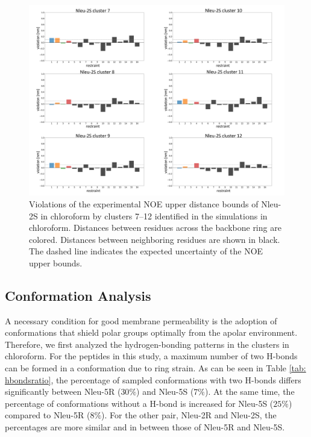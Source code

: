 \begin{figure}[h!]
    \centering
    \includegraphics[width=\textwidth]{7_chapter_5/fig/results/NMR_2Sb.png}
    \caption{Violations  of  the  experimental  NOE  upper  distance  bounds  of  Nleu-2S  in chloroform by clusters 7–12 identified in the simulations in chloroform. Distances between residues across the backbone ring are colored. Distances between neighboring residues are shown in black. The dashed line indicates the expected uncertainty of the NOE upper bounds.}
    \label{fig: SINOE violations Nleu-2SII}
\end{figure}

\FloatBarrier

\subsection{Conformation Analysis}
A necessary condition for good membrane permeability is the adoption of conformations that shield polar groups optimally from the apolar environment. \cite{Sebastiano2018, Alex2011, Tyagi2018}
Therefore, we first analyzed the hydrogen-bonding patterns in the clusters in chloroform. For the peptides in this study, a maximum number of two H-bonds can be formed in a conformation due to ring strain. As can be seen in Table \ref{tab: hbondsratio}, the percentage of sampled conformations with two H-bonds differs significantly between Nleu-5R ($30\%$) and Nleu-5S ($7\%$). At the same time, the percentage of conformations without a H-bond is increased for Nleu-5S ($25\%$) compared to Nleu-5R ($8\%$). For the other pair, Nleu-2R and Nleu-2S, the percentages are more similar and in between those of Nleu-5R and Nleu-5S.


